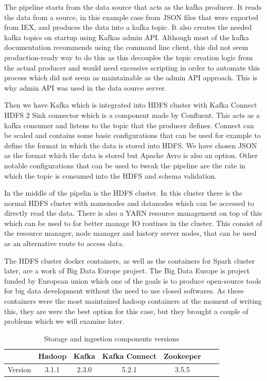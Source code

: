 The pipeline starts from the data source that acts as the kafka producer.
It reads the data from a source, in this example case from JSON files that were exported from IEX, and produces the data into a kafka topic. 
It also creates the needed kafka topics on startup using Kafkas admin API.
Although most of the kafka documentation recommends using the command line client, this did not seem production-ready way to do this as this decouples the topic creation logic from the actual producer and would need excessive scripting in order to automate this process which did not seem as maintainable as the admin API approach.
This is why admin API was used in the data source server. 

Then we have Kafka which is integrated into HDFS cluster with Kafka Connect HDFS 2 Sink connector which is a component made by Confluent.
This acts as a kafka consumer and listens to the topic that the producer defines.
Connect can be scaled and contains some basic configurations that can be used for example to define the format in which the data is stored into HDFS.
We have chosen JSON as the format which the data is stored but Apache Avro is also an option.
Other notable configurations that can be used to tweak the pipeline are the rate in which the topic is consumed into the HDFS and schema validation.

In the middle of the pipelin is the HDFS cluster.
In this cluster there is the normal HDFS cluster with namenodes and datanodes which can be accessed to directly read the data.
There is also a YARN resource management on top of this which can be used to for better manage IO routines in the cluster.
This consist of the resource manager, node manager and history server nodes, that can be used as an alternative route to access data.

The HDFS cluster docker containers, as well as the containers for Spark cluster later, are a work of Big Data Europe project.
The Big Data Europe is project funded by European union which one of the goals is to produce open-source tools for big data development without the need to use closed softwares.\cite{bigdataeurope}
As these containers were the most maintained hadoop containers at the moment of writing this, they are were the best option for this case, but they brought a couple of problems which we will examine later.

\begin{table}[! htbp]\centering
    \caption{Storage and ingestion components versions}
    \begin{threeparttable}
        \begin{tabular}{|c|c|c|c|c|c|c|} 
        \hline
        & Hadoop & Kafka & Kafka Connect & Zookeeper \\ \hline
        Version & 3.1.1 & 2.3.0 & 5.2.1 & 3.5.5\\
        \hline
        \end{tabular}
    \end{threeparttable}
\end{table}

